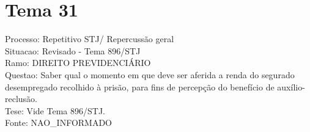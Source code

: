 \documentclass[12pt]{article}
\begin{document}
\section*{Tema 31}
Processo: Repetitivo STJ/ Repercussão geral\\
Situacao: Revisado - Tema 896/STJ\\
Ramo: DIREITO PREVIDENCIÁRIO\\
Questao: Saber qual o momento em que deve ser aferida a renda do segurado desempregado recolhido à prisão, para fins de percepção do benefício de auxílio-reclusão.\\
Tese: Vide Tema 896/STJ.\\
Fonte: NAO\_INFORMADO
\end{document}
